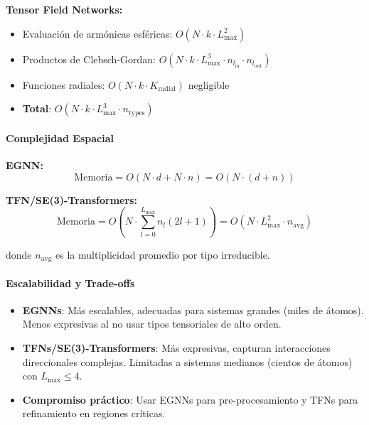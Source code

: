 \textbf{Tensor Field Networks:}
\begin{itemize}
    \item Evaluación de armónicas esféricas: $O(N \cdot k \cdot L_{\max}^2)$
    \item Productos de Clebsch-Gordan: $O(N \cdot k \cdot L_{\max}^3 \cdot n_{l_{\text{in}}} \cdot n_{l_{\text{out}}})$
    \item Funciones radiales: $O(N \cdot k \cdot K_{\text{radial}})$ negligible
    \item \textbf{Total}: $O(N \cdot k \cdot L_{\max}^3 \cdot n_{\text{types}})$
\end{itemize}

\paragraph{Complejidad Espacial}

\textbf{EGNN:}
\begin{equation}
\text{Memoria} = O(N \cdot d + N \cdot n) = O(N \cdot (d + n))
\end{equation}

\textbf{TFN/SE(3)-Transformers:}
\begin{equation}
\text{Memoria} = O\left(N \cdot \sum_{l=0}^{L_{\max}} n_l (2l+1)\right) = O(N \cdot L_{\max}^2 \cdot n_{\text{avg}})
\end{equation}

donde $n_{\text{avg}}$ es la multiplicidad promedio por tipo irreducible.

\paragraph{Escalabilidad y Trade-offs}

\begin{itemize}
    \item \textbf{EGNNs}: Más escalables, adecuadas para sistemas grandes (miles de átomos). Menos expresivas al no usar tipos tensoriales de alto orden.

    \item \textbf{TFNs/SE(3)-Transformers}: Más expresivas, capturan interacciones direccionales complejas. Limitadas a sistemas medianos (cientos de átomos) con $L_{\max} \leq 4$.

    \item \textbf{Compromiso práctico}: Usar EGNNs para pre-procesamiento y TFNs para refinamiento en regiones críticas.
\end{itemize}

